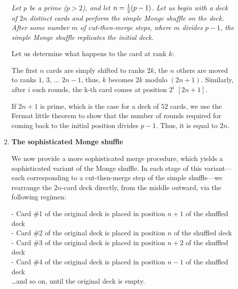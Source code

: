 \begin{itemize}
\begin{enumerate}
{\em Let $p$ be a prime ($p>2$), and let $n = {1 \over 2} (p-1)$.  
Let us begin with a deck of $2n$ distinct cards and perform the simple Monge shuffle on the deck.  
After some number $m$ of cut-then-merge steps, where $m$ divides $p-1$, the simple Monge shuffle replicates the initial deck.}
\smallskip

Let us determine what happens to the card at rank $k$:

The first $n$ cards are simply shifted to ranks $2k$, the $n$ others are moved to ranks $1$, $3$, ... $2n-1$,
thus, $k$ becomes $2k$ modulo $(2n+1)$. 
Similarly, after $i$ such rounds, the k-th card comes at position $2^i$ $[2n+1]$. 

If $2n+1$ is prime, which is the case for a deck of $52$ cards, 
we use the Fermat little theorem to show that the number of rounds required for coming back to the initial position 
divides $p-1$.
Thus, it is equal to $2n$. 

\medskip
\item {\bf The sophisticated Monge shuffle}
\smallskip

We now provide a more sophisticated merge procedure, which yields a sophisticated variant of the Monge shuffle. 
In each stage of this variant---each corresponding to a cut-then-merge step of the simple shuffle---we rearrange the $2n$-card deck directly, from the middle outward, via the following regimen:
\smallskip

\noindent
- Card \#1 of the original deck is placed in position $n+1$ of the shuffled deck \\
- Card \#2 of the original deck is placed in position $n$ of the shuffled deck \\
- Card \#3 of the original deck is placed in position $n+2$ of the shuffled deck \\
- Card \#4 of the original deck is placed in position $n-1$ of the shuffled deck \\
\hspace*{.1in} \ldots and so on, until the original deck is empty.


\end{enumerate}
\end{itemize}
